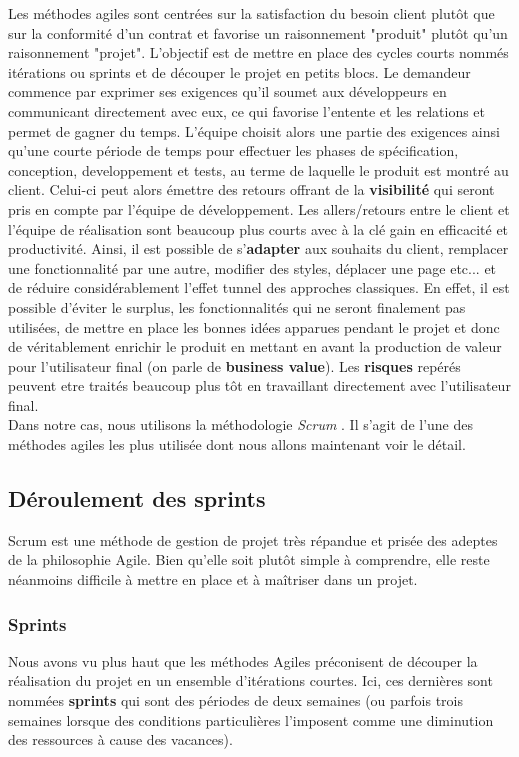 	Les méthodes agiles sont centrées sur la satisfaction du besoin client plutôt que sur la conformité d'un contrat et favorise un raisonnement "produit" plutôt qu'un raisonnement "projet". L'objectif est de mettre en place des cycles courts nommés itérations ou sprints et de découper le projet en petits blocs. Le demandeur commence par exprimer ses exigences qu'il soumet aux développeurs en communicant directement avec eux, ce qui favorise l'entente et les relations et permet de gagner du temps. L'équipe choisit alors une partie des exigences ainsi qu'une courte période de temps pour effectuer les phases de spécification, conception, developpement et tests, au terme de laquelle le produit est montré au client. Celui-ci peut alors émettre des retours offrant de la \textbf{visibilité} qui seront pris en compte par l'équipe de développement. Les allers/retours entre le client et l'équipe de réalisation sont beaucoup plus courts avec à la clé gain en efficacité et productivité. Ainsi, il est possible de s'\textbf{adapter} aux souhaits du client, remplacer une fonctionnalité par une autre, modifier des styles, déplacer une page etc... et de réduire considérablement l'effet tunnel des approches classiques. En effet, il est possible d'éviter le surplus, les fonctionnalités qui ne seront finalement pas utilisées, de mettre en place les bonnes idées apparues pendant le projet et donc de véritablement enrichir le produit en mettant en avant la production de valeur pour l'utilisateur final (on parle de \textbf{business value}). Les \textbf{risques} repérés peuvent etre traités beaucoup plus tôt en travaillant directement avec l'utilisateur final. \\

	Dans notre cas, nous utilisons la méthodologie \textit{Scrum} \cite{bib_agile3}. Il s'agit de l'une des méthodes agiles les plus utilisée dont nous allons maintenant voir le détail.

\subsection{Déroulement des sprints}
\label{deroulementSprint}

	Scrum est une méthode de gestion de projet très répandue et prisée des adeptes de la philosophie Agile. Bien qu'elle soit plutôt simple à comprendre, elle reste néanmoins difficile à mettre en place et à maîtriser dans un projet. \\
	
	\subsubsection{Sprints}
	Nous avons vu plus haut que les méthodes Agiles préconisent de découper la réalisation du projet en un ensemble d'itérations courtes. Ici, ces dernières sont nommées \textbf{sprints} qui sont des périodes de deux semaines (ou parfois trois semaines lorsque des conditions particulières l'imposent comme une diminution des ressources à cause des vacances).
	

